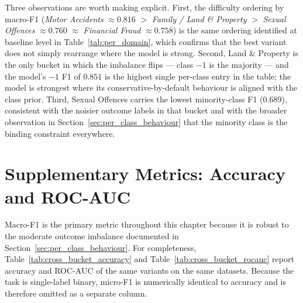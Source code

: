 Three observations are worth making explicit. First, the
difficulty ordering by macro-F1 (\textit{Motor Accidents}
$\approx 0.816$ $>$ \textit{Family / Land \& Property} $>$
\textit{Sexual Offences} $\approx 0.760$ $\approx$
\textit{Financial Fraud} $\approx 0.758$) is the same ordering
identified at baseline level in
Table~\ref{tab:per_domain}, which confirms that the best variant
does not simply rearrange where the model is strong. Second, Land
\& Property is the only bucket in which the imbalance flips ---
class $-1$ is the majority --- and the model's $-1$ F1 of $0.851$ is
the highest single per-class entry in the table; the model is
strongest where its conservative-by-default behaviour is aligned
with the class prior. Third, Sexual Offences carries the lowest
minority-class F1 ($0.689$), consistent with the noisier outcome
labels in that bucket and with the broader observation in
Section~\ref{sec:per_class_behaviour} that the minority class is the
binding constraint everywhere.

\section{Supplementary Metrics: Accuracy and ROC-AUC}
\label{sec:supplementary_metrics}

Macro-F1 is the primary metric throughout this chapter because it is
robust to the moderate outcome imbalance documented in
Section~\ref{sec:per_class_behaviour}. For completeness,
Table~\ref{tab:cross_bucket_accuracy} and
Table~\ref{tab:cross_bucket_rocauc} report accuracy and ROC-AUC of
the same variants on the same datasets. Because the task is
single-label binary, micro-F1 is numerically identical to accuracy
and is therefore omitted as a separate column.


